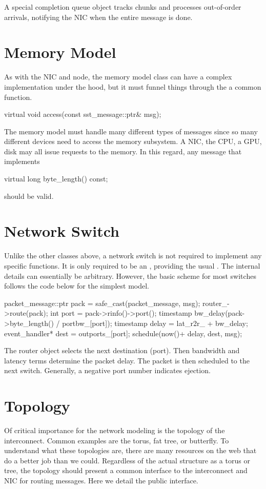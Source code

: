 A special completion queue object tracks chunks and processes out-of-order arrivals,
notifying the NIC when the entire message is done.

\section{Memory Model}
As with the NIC and node, the memory model class can have a complex implementation under the hood,
but it must funnel things through the a common function.

\begin{CppCode}
  virtual void
  access(const sst_message::ptr& msg);
\end{CppCode}

The memory model must handle many different types of messages since so many different devices need to access the memory subsystem.
A NIC, the CPU, a GPU, disk may all issue requests to the memory.
In this regard, any message that implements

\begin{CppCode}
  virtual long
  byte_length() const;
\end{CppCode}
should be valid.

\section{Network Switch}

Unlike the other classes above, a network switch is not required to implement any specific functions.
It is only required to be an , providing the usual .
The internal details can essentially be arbitrary.
However, the basic scheme for most switches follows the code below for the simplest  model.

\begin{CppCode}
  packet_message::ptr pack = safe_cast(packet_message, msg);
  router_->route(pack);
  int port = pack->rinfo()->port();
  timestamp bw_delay(pack->byte_length() / portbw_[port]);
  timestamp delay = lat_r2r_ + bw_delay;
  event_handler* dest = outports_[port];
  schedule(now()+ delay, dest, msg);
\end{CppCode}
The router object selects the next destination (port).
Then bandwidth and latency terms determine the packet delay.
The packet is then scheduled to the next switch.
Generally, a negative port number indicates ejection.

\section{Topology}
\label{sec:topology}
Of critical importance for the network modeling is the topology of the interconnect.
Common examples are the torus, fat tree, or butterfly.
To understand what these topologies are, there are many resources on the web that do a better job than we could.
Regardless of the actual structure as a torus or tree, the topology should present a common interface to the interconnect and NIC for routing messages.
Here we detail the public interface.
